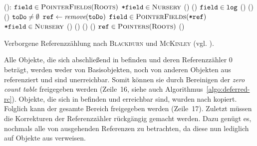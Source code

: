 \begin{algorithm}[h]
\begin{algorithmic}[1]
	\State \Atomic {}():
	\State \quad \FOREACH $\texttt{field} \in \textsc{PointerFields}(\textsc{Roots})$
	\State \quad \quad \IF $\texttt{*field} \in \textsc{Nursery}$		
	\State \quad \quad \quad {}()	
	\State \quad \quad {}()	
	\State \quad \FOREACH $\texttt{field} \in \texttt{log}$	
	\State \quad \quad {}()
	\State \quad \quad {}()
	\State \quad \quad {}()
	\State \quad \WHILE $\texttt{toDo} \neq \emptyset$
	\State \quad \quad $\texttt{ref} \gets \textit{remove}(\texttt{toDo})$
	\State \quad \quad \FOREACH $\texttt{field} \in \textsc{PointerFields}(\texttt{*ref})$
	\State \quad \quad \quad \IF $\texttt{*field} \in \textsc{Nursery}$	
	\State \quad \quad \quad \quad {}()
	\State \quad \quad \quad {}()
	\State \quad {}()	
	\State \quad {}(\Nursery)	
	\State \quad \FOREACH $\texttt{ref} \in \textsc{Pointers}(\textsc{Roots})$	
	\State \quad \quad {}()	
\end{algorithmic}
\caption[Verborgene Referenzzählung nach \textsc{Blackburn} und \textsc{McKinley}]{Verborgene Referenzzählung nach \textsc{Blackburn} und \textsc{McKinley} (vgl. \cite[S. 346ff]{blackburn2003}).}
\label{algo:ulterior-rc}
\end{algorithm}

Alle Objekte, die sich abschließend in \Mature befinden und deren Referenzzähler $0$ beträgt, werden weder von Basisobjekten, noch von anderen Objekten aus \Mature referenziert und sind unerreichbar.
Somit können sie durch Bereinigen der \textit{zero count table}  freigegeben werden (Zeile~16, siehe auch Algorithmus~\ref{algo:deferred-rc}).
Objekte, die sich in \Nursery befinden und erreichbar sind, wurden nach \Mature kopiert.
Folglich kann der gesamte Bereich freigegeben werden (Zeile~17).
Zuletzt müssen die Korrekturen der Referenzzähler rückgängig gemacht werden.
Dazu genügt es, nochmals alle von \Roots ausgehenden Referenzen zu betrachten, da diese nun lediglich auf Objekte aus \Mature verweisen.

